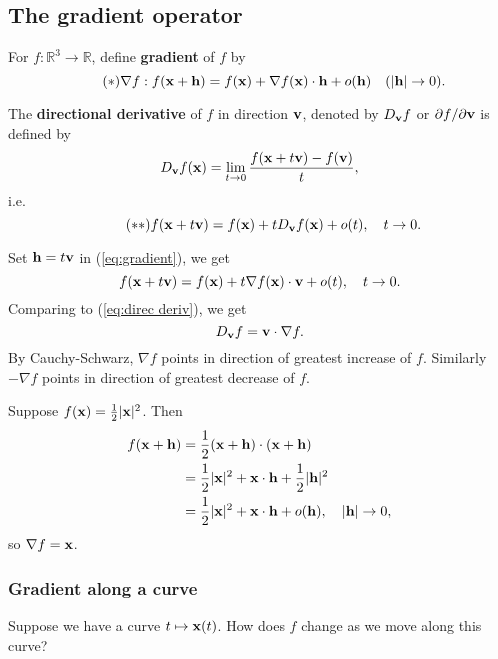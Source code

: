 \subsection{The gradient operator}
\begin{definition}[Gradient]
    For $ f: \mathbb{R}^{3}\to \mathbb{R} $, define \textbf{gradient} of $f$ by 
    \begin{equation}\label{eq:gradient}\tag{$ * $}
        \nabla f : f({\bf x}+{\bf h}) = f({\bf x})+ \nabla f({\bf x}) \cdot {\bf h}+o({\bf h})\quad (|{\bf h}|\to 0).
    \end{equation}
\end{definition}
\begin{definition}
    The \textbf{directional derivative} of $f$ in direction ${\bf v}$, denoted by $ D_{\bf v} f $ or $ \partial f/\partial {\bf v}  $ is defined by 
    \[
        D_{\bf v} f({\bf x}) = \lim_{t \to 0} \frac{f({\bf x}+t{\bf v})-f({\bf v})}{t}, 
    \]
    i.e.
    \begin{equation}\label{eq:direc deriv}\tag{$ ** $}
        f({\bf x}+t{\bf v})=f({\bf x})+t D_{\bf v} f({\bf x})+o(t),\quad t\to 0. 
    \end{equation}
\end{definition}

Set $ {\bf h}=t{\bf v} $ in (\ref{eq:gradient}), we get 
\[
    f({\bf x}+t{\bf v}) = f({\bf x})+t \nabla f({\bf x}) \cdot {\bf v} + o(t),\quad t\to 0.
\]
Comparing to (\ref{eq:direc deriv}), we get 
\[
    D_{\bf v} f = {\bf v} \cdot \nabla f.
\]
By Cauchy-Schwarz, $ \nabla f $ points in direction of greatest increase of $f$. Similarly $ - \nabla f $ points in direction of greatest decrease of $f$.

\begin{example}
    Suppose $ f({\bf x}) = \frac{1}{2}|{\bf x}|^2 $. Then 
    \begin{align*}
        f({\bf x}+{\bf h}) &= \frac{1}{2}({\bf x}+{\bf h})\cdot ({\bf x}+{\bf h})\\ 
        &= \frac{1}{2}|{\bf x}|^2+ {\bf x} \cdot {\bf h}+\frac{1}{2}|{\bf h}|^2\\ 
        &= \frac{1}{2}|{\bf x}|^2+{\bf x} \cdot {\bf h}+o({\bf h}),\quad |{\bf h}|\to 0,
    \end{align*}
    so $ \nabla f ={\bf x} $.
\end{example}

\subsubsection{Gradient along a curve}
Suppose we have a curve $ t \mapsto {\bf x}(t) $. How does $f$ change as we move along this curve?

